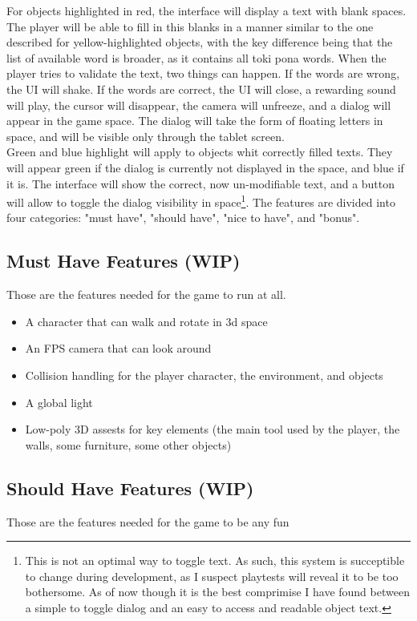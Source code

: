 \documentclass{scrartcl}
\begin{document}
			For objects highlighted in red, the interface will display a text with blank spaces. The player will be able to fill in this blanks in a manner similar to the one described for yellow-highlighted objects, with the key difference being that the list of available word is broader, as it contains all toki pona words. When the player tries to validate the text, two things can happen. If the words are wrong, the UI will shake. If the words are correct, the UI will close, a rewarding sound will play, the cursor will disappear, the camera will unfreeze, and a dialog will appear in the game space. The dialog will take the form of floating letters in space, and will be visible only through the tablet screen.\\
			Green and blue highlight will apply to objects whit correctly filled texts. They will appear green if the dialog is currently not displayed in the space, and blue if it is. The interface will show the correct, now un-modifiable text, and a button will allow to toggle the dialog visibility in space\footnote{This is not an optimal way to toggle text. As such, this system is succeptible to change during development, as I suspect playtests will reveal it to be too bothersome. As of now though it is the best comprimise I have found between a simple to toggle dialog and an easy to access and readable object text.}.
			The features are divided into four categories: "must have", "should have", "nice to have", and "bonus".
		\subsection{Must Have Features (WIP)}
			Those are the features needed for the game to run at all.
			\begin{itemize}
				\item A character that can walk and rotate in 3d space
				\item An FPS camera that can look around
				\item Collision handling for the player character, the environment, and objects
				\item A global light
				\item Low-poly 3D assests for key elements (the main tool used by the player, the walls, some furniture, some other objects)
				
			\end{itemize}
		\subsection{Should Have Features (WIP)}
			Those are the features needed for the game to be any fun
\end{document}
